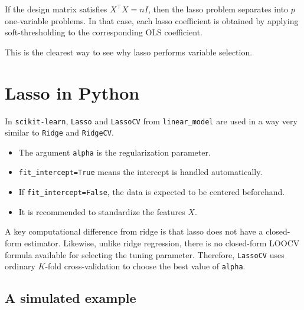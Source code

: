 \documentclass[
  letterpaper,
  DIV=11,
  numbers=noendperiod]{scrreprt}
\providecommand{\tightlist}{%
  \setlength{\itemsep}{0pt}\setlength{\parskip}{0pt}}
\theoremstyle{definition}
\theoremstyle{definition}
\theoremstyle{plain}
\theoremstyle{plain}
\theoremstyle{remark}
\begin{document}
\begin{tcolorbox}[enhanced jigsaw, arc=.35mm, bottomrule=.15mm, bottomtitle=1mm, breakable, colback=white, colbacktitle=quarto-callout-note-color!10!white, colframe=quarto-callout-note-color-frame, coltitle=black, left=2mm, leftrule=.75mm, opacityback=0, opacitybacktitle=0.6, rightrule=.15mm, title=\textcolor{quarto-callout-note-color}{\faInfo}\hspace{0.5em}{Orthogonal design}, titlerule=0mm, toprule=.15mm, toptitle=1mm]

If the design matrix satisfies \(X^\top X = nI\), then the lasso problem
separates into \(p\) one-variable problems. In that case, each lasso
coefficient is obtained by applying soft-thresholding to the
corresponding OLS coefficient.

This is the clearest way to see why lasso performs variable selection.

\end{tcolorbox}

\section{Lasso in Python}\label{lasso-in-python}

In \texttt{scikit-learn}, \texttt{Lasso} and \texttt{LassoCV} from
\texttt{linear\_model} are used in a way very similar to \texttt{Ridge}
and \texttt{RidgeCV}.

\begin{itemize}
\tightlist
\item
  The argument \texttt{alpha} is the regularization parameter.
\item
  \texttt{fit\_intercept=True} means the intercept is handled
  automatically.
\item
  If \texttt{fit\_intercept=False}, the data is expected to be centered
  beforehand.
\item
  It is recommended to standardize the features \(X\).
\end{itemize}

A key computational difference from ridge is that lasso does not have a
closed-form estimator. Likewise, unlike ridge regression, there is no
closed-form LOOCV formula available for selecting the tuning parameter.
Therefore, \texttt{LassoCV} uses ordinary \(K\)-fold cross-validation to
choose the best value of \texttt{alpha}.

\subsection{A simulated example}\label{a-simulated-example}
\end{document}
